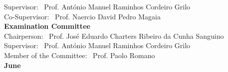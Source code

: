 \begin{titlepage}
\begin{center}
{\large Supervisor: \ Prof. António Manuel Raminhos Cordeiro Grilo}\\
{\large Co-Supervisor: \ Prof. Naercio David Pedro Magaia}\\[2cm]
{\Large \textbf{Examination Committee}}\\[1cm]
{\large Chairperson: \ Prof. José Eduardo Charters Ribeiro da Cunha Sanguino}\\
{\large Supervisor: \ Prof. António Manuel Raminhos Cordeiro Grilo}\\
{\large Member of the Committee: \ Prof. Paolo Romano}\\[2cm]


{\Large \textbf{June}}\\
\end{center}
\end{titlepage}